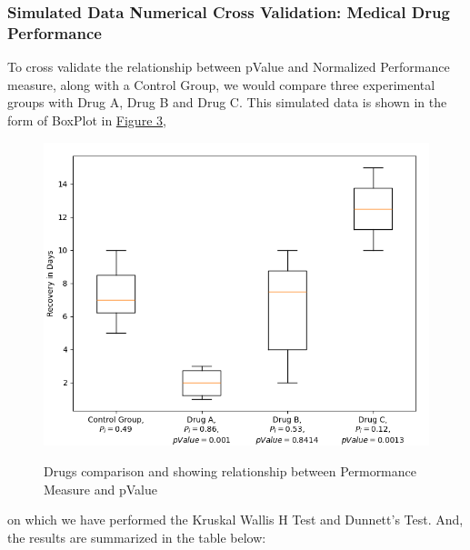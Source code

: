 \documentclass[man,floatsintext]{apa7}
\begin{document}
\subsubsection{Simulated Data Numerical Cross Validation: Medical Drug Performance}
To cross validate the relationship between pValue and Normalized Performance measure, along with a Control Group, we would compare three experimental groups with Drug A, Drug B and Drug C. This simulated data is shown in the form of BoxPlot in \hyperref[fig:box-plot]{Figure 3}, 
\begin{figure}[!htbp]
	\caption{Drugs comparison and showing relationship between Permormance Measure and pValue}
	\centering
	\includegraphics [scale=0.75]{images/simulation-data-kruskal-dunnett.png}
	\label{fig:box-plot}
\end{figure}
on which we have performed the Kruskal Wallis H Test and Dunnett's Test. And, the results are summarized in the table below:
	
\end{document}

